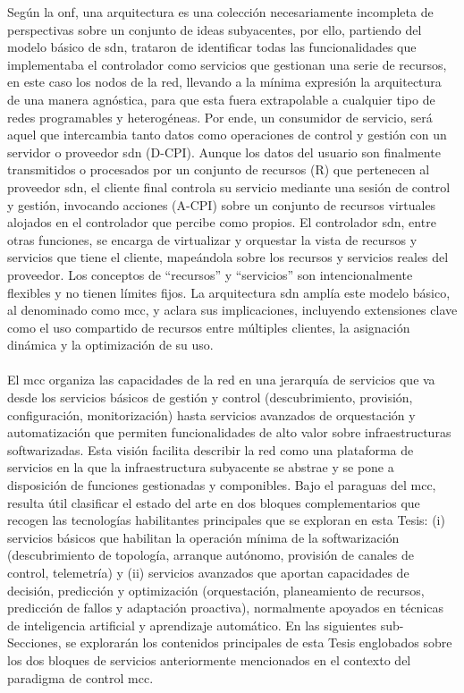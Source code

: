 Según la \gls{onf}, una arquitectura es una colección necesariamente incompleta de perspectivas sobre un conjunto de ideas subyacentes, por ello, partiendo del modelo básico de \gls{sdn}, trataron de identificar todas las funcionalidades que implementaba el controlador como servicios que gestionan una serie de recursos, en este caso los nodos de la red, llevando a la mínima expresión la arquitectura de una manera agnóstica, para que esta fuera extrapolable a cualquier tipo de redes programables y heterogéneas. Por ende, un consumidor de servicio, será aquel que intercambia tanto datos como operaciones de control y gestión con un servidor o proveedor \gls{sdn} (D-CPI).  Aunque los datos del usuario son finalmente transmitidos o procesados por un conjunto de recursos (R) que pertenecen al proveedor \gls{sdn}, el cliente final controla su servicio mediante una sesión de control y gestión, invocando acciones (A-CPI) sobre un conjunto de recursos virtuales alojados en el controlador que percibe como propios. El controlador \gls{sdn}, entre otras funciones, se encarga de virtualizar y orquestar la vista de recursos y servicios que tiene el cliente, mapeándola sobre los recursos y servicios reales del proveedor. Los conceptos de ``recursos'' y ``servicios'' son intencionalmente flexibles y no tienen límites fijos. La arquitectura \gls{sdn} amplía este modelo básico, al denominado como \gls{mcc}, y aclara sus implicaciones, incluyendo extensiones clave como el uso compartido de recursos entre múltiples clientes, la asignación dinámica y la optimización de su uso.\\
\\
El \gls{mcc} organiza las capacidades de la red en una jerarquía de servicios que va desde los servicios básicos de gestión y control (descubrimiento, provisión, configuración, monitorización) hasta servicios avanzados de orquestación y automatización que permiten funcionalidades de alto valor sobre infraestructuras softwarizadas. Esta visión facilita describir la red como una plataforma de servicios en la que la infraestructura subyacente se abstrae y se pone a disposición de funciones gestionadas y componibles. Bajo el paraguas del \gls{mcc}, resulta útil clasificar el estado del arte en dos bloques complementarios que recogen las tecnologías habilitantes principales que se exploran en esta Tesis: (i) servicios básicos que habilitan la operación mínima de la softwarización (descubrimiento de topología, arranque autónomo, provisión de canales de control, telemetría) y (ii) servicios avanzados que aportan capacidades de decisión, predicción y optimización (orquestación, planeamiento de recursos, predicción de fallos y adaptación proactiva), normalmente apoyados en técnicas de inteligencia artificial y aprendizaje automático. En las siguientes sub-Secciones, se explorarán los contenidos principales de esta Tesis englobados sobre los dos bloques de servicios anteriormente mencionados en el contexto del paradigma de control \gls{mcc}.


